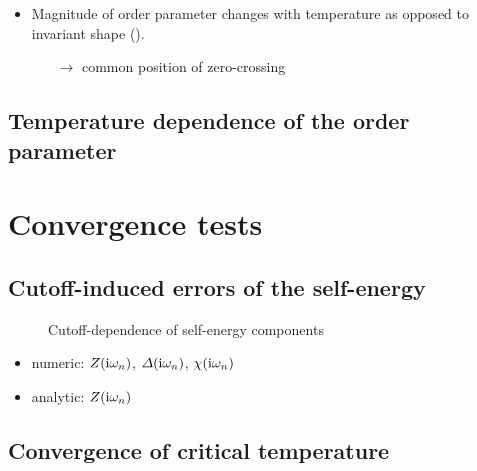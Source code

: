 \begin{itemize}
    \item Magnitude of order parameter changes with temperature as opposed to
          invariant shape ().
    \begin{itemize}
        \item[$\rightarrow$] common position of zero-crossing
    \end{itemize}
\end{itemize}

\subsection{Temperature dependence of the order parameter}

\section{Convergence tests}

\subsection{Cutoff-induced errors of the self-energy}

\begin{figure}
    \small
    \begin{minipage}{4.666cm}
	    
    \end{minipage}%
    \begin{minipage}{4.666cm}
	    
    \end{minipage}%
    \begin{minipage}{4.666cm}
	    
    \end{minipage}%
	\caption{Cutoff-dependence of self-energy components}
\end{figure}

\begin{itemize}
    \item numeric: $Z(\mathrm i \omega_n)$, $\varDelta(\mathrm i \omega_n)$, $\chi(\mathrm i \omega_n)$
    \item analytic: $Z(\mathrm i \omega_n)$
\end{itemize}

\subsection{Convergence of critical temperature}

